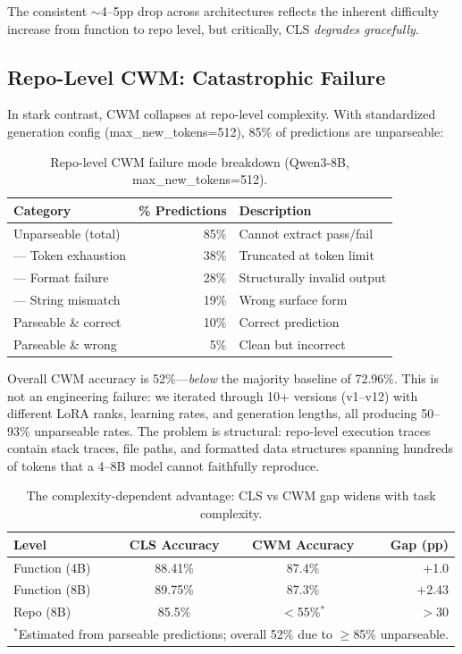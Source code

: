 \documentclass[11pt]{article}
\begin{document}
The consistent $\sim$4--5pp drop across architectures reflects the inherent difficulty increase from function to repo level, but critically, CLS \emph{degrades gracefully}.

\subsection{Repo-Level CWM: Catastrophic Failure}
\label{sec:repo-cwm}

In stark contrast, CWM collapses at repo-level complexity. With standardized generation config (max\_new\_tokens=512), 85\% of predictions are unparseable:

\begin{table}[h]
\centering
\caption{Repo-level CWM failure mode breakdown (Qwen3-8B, max\_new\_tokens=512).}
\label{tab:cwm-failure}
\begin{tabular}{lrl}
\toprule
Category & \% Predictions & Description \\
\midrule
Unparseable (total) & 85\% & Cannot extract pass/fail \\
\quad--- Token exhaustion & 38\% & Truncated at token limit \\
\quad--- Format failure & 28\% & Structurally invalid output \\
\quad--- String mismatch & 19\% & Wrong surface form \\
Parseable \& correct & 10\% & Correct prediction \\
Parseable \& wrong & 5\% & Clean but incorrect \\
\bottomrule
\end{tabular}
\end{table}

Overall CWM accuracy is 52\%---\emph{below} the majority baseline of 72.96\%. This is not an engineering failure: we iterated through 10+ versions (v1--v12) with different LoRA ranks, learning rates, and generation lengths, all producing 50--93\% unparseable rates. The problem is structural: repo-level execution traces contain stack traces, file paths, and formatted data structures spanning hundreds of tokens that a 4--8B model cannot faithfully reproduce.

\begin{table}[h]
\centering
\caption{The complexity-dependent advantage: CLS vs CWM gap widens with task complexity.}
\label{tab:complexity-gap}
\begin{tabular}{lccr}
\toprule
Level & CLS Accuracy & CWM Accuracy & Gap (pp) \\
\midrule
Function (4B) & 88.41\% & 87.4\% & +1.0 \\
Function (8B) & 89.75\% & 87.3\% & +2.43 \\
Repo (8B) & 85.5\% & $<$55\%$^*$ & $>$30 \\
\bottomrule
\multicolumn{4}{l}{\footnotesize $^*$Estimated from parseable predictions; overall 52\% due to $\geq$85\% unparseable.}
\end{tabular}
\end{table}
\end{document}
